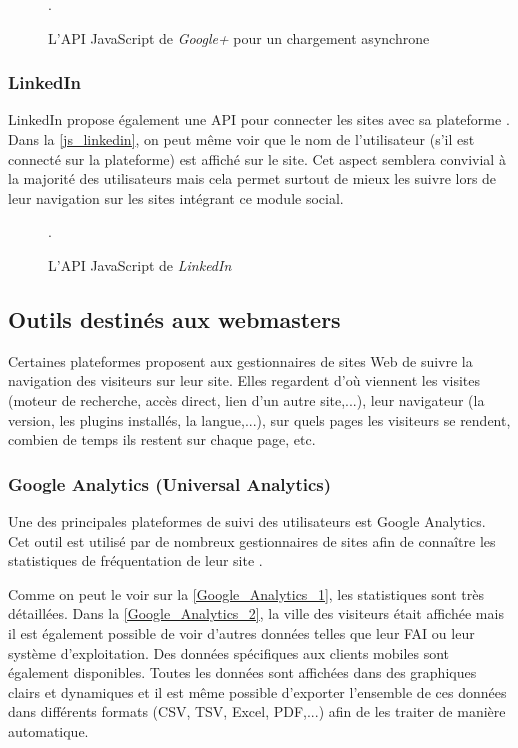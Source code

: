 \begin{figure}[h]
	\centering
	
	\caption{\label{js_google_plus_async}L'API JavaScript de \textit{Google+} pour un chargement asynchrone}.
\end{figure}

\subsubsection{LinkedIn}
LinkedIn propose également une API pour connecter les sites avec sa plateforme \cite{javascript_linkedin}. Dans la \autoref{js_linkedin}, on peut même voir que le nom de l'utilisateur (s'il est connecté sur la plateforme) est affiché sur le site. Cet aspect semblera convivial à la majorité des utilisateurs mais cela permet surtout de mieux les suivre lors de leur navigation sur les sites intégrant ce module social.

\begin{figure}[h]
	\centering
	
	\caption{\label{js_linkedin}L'API JavaScript de \textit{LinkedIn}}.
\end{figure}

\subsection{Outils destinés aux webmasters}
Certaines plateformes proposent aux gestionnaires de sites Web de suivre la navigation des visiteurs sur leur site. Elles regardent d'où viennent les visites (moteur de recherche, accès direct, lien d'un autre site,...), leur navigateur (la version, les plugins installés, la langue,...), sur quels pages les visiteurs se rendent, combien de temps ils restent sur chaque page, etc.

\subsubsection{Google Analytics (Universal Analytics)}
\label{google_analytics}
Une des principales plateformes de suivi des utilisateurs est Google Analytics. Cet outil est utilisé par de nombreux gestionnaires de sites afin de connaître les statistiques de fréquentation de leur site \cite{javascript_google_analytics}.

Comme on peut le voir sur la \autoref{Google_Analytics_1}, les statistiques sont très détaillées. Dans la \autoref{Google_Analytics_2}, la ville des visiteurs était affichée mais il est également possible de voir d'autres données telles que leur FAI ou leur système d'exploitation. Des données spécifiques aux clients mobiles sont également disponibles. Toutes les données sont affichées dans des graphiques clairs et dynamiques et il est même possible d'exporter l'ensemble de ces données dans différents formats (CSV, TSV, Excel, PDF,...) afin de les traiter de manière automatique.
\newline

